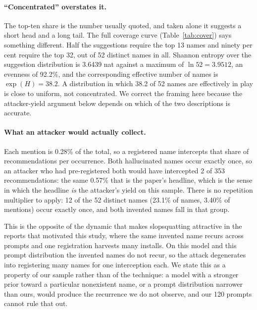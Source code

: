 \documentclass[journal]{IEEEtran}
\theoremstyle{definition}
\newcommand{\Nprompts}{120}
\newcommand{\Npkg}{353}
\newcommand{\Ndistinctpkg}{52}
\newcommand{\Rate}{0.57}
\newcommand{\SOnes}{12}
\newcommand{\SOnesPctNames}{23.1}
\newcommand{\SOnesPctMentions}{3.40}
\newcommand{\SShannon}{3.6439}
\newcommand{\SShannonMax}{3.9512}
\newcommand{\SEven}{92.2}
\newcommand{\SEffNames}{38.2}
\newcommand{\SHalfAt}{13}
\newcommand{\SNinetyAt}{32}
\newcommand{\SPerName}{0.28}
\newcommand{\SHallMentions}{2}
\begin{document}
\paragraph{``Concentrated'' overstates it.} The top-ten share is the number
usually quoted, and taken alone it suggests a short head and a long tail. The
full coverage curve (Table~\ref{tab:cover}) says something different. Half the
suggestions require the top \SHalfAt{} names and ninety per cent require the top
\SNinetyAt{}, out of \Ndistinctpkg{} distinct names in all. Shannon entropy over
the suggestion distribution is \SShannon{} nat against a maximum of
$\ln \Ndistinctpkg = \SShannonMax$, an evenness of \SEven\%, and the
corresponding effective number of names is $\exp(H) = \SEffNames$. A
distribution in which \SEffNames{} of \Ndistinctpkg{} names are effectively in
play is close to uniform, not concentrated. We correct the framing here because
the attacker-yield argument below depends on which of the two descriptions is
accurate.

\paragraph{What an attacker would actually collect.} Each mention is
\SPerName\% of the total, so a registered name intercepts that share of
recommendations per occurrence. Both hallucinated names occur exactly once, so
an attacker who had pre-registered both would have intercepted
\SHallMentions{} of \Npkg{} recommendations: the same \Rate\% that is the
paper's headline, which is the sense in which the headline \emph{is} the
attacker's yield on this sample. There is no repetition multiplier to apply:
\SOnes{} of the \Ndistinctpkg{} distinct names (\SOnesPctNames\% of names,
\SOnesPctMentions\% of mentions) occur exactly once, and both invented names
fall in that group.

This is the opposite of the dynamic that makes slopsquatting attractive in the
reports that motivated this study, where the same invented name recurs across
prompts and one registration harvests many installs. On this model and this
prompt distribution the invented names do not recur, so the attack degenerates
into registering many names for one interception each. We state this as a
property of our sample rather than of the technique: a model with a stronger
prior toward a particular nonexistent name, or a prompt distribution narrower
than ours, would produce the recurrence we do not observe, and our \Nprompts{}
prompts cannot rule that out.
\end{document}
